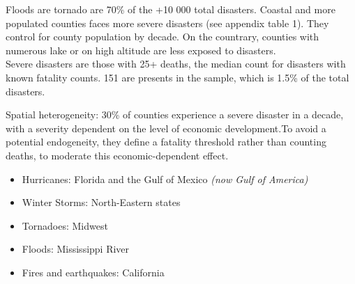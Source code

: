 \documentclass[11pt, oneside]{article}   	%
\begin{document}
Floods are tornado are 70\% of the +10 000 total disasters. Coastal and more populated counties faces more severe disasters (see appendix table 1). They control for county population by decade. On the countrary, counties with numerous lake or on high altitude are less exposed to disasters. \\

Severe disasters are those with 25+ deaths, the median count for disasters with known fatality counts. 151 are presents in the sample, which is 1.5\% of the total disasters. 

Spatial heterogeneity: 30\% of counties experience a severe disaster in a decade, with a severity dependent on the level of economic development.To avoid a potential endogeneity, they define a fatality threshold rather than counting deaths, to moderate this economic-dependent effect. \\

\begin{itemize}
    \item Hurricanes: Florida and the Gulf of Mexico \textit{(now Gulf of America)}
    \item Winter Storms: North-Eastern states
    \item Tornadoes: Midwest
    \item Floods: Mississippi River
    \item Fires and earthquakes: California
\end{itemize}
\end{document}
